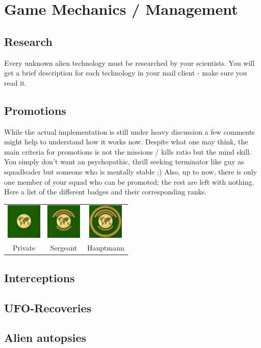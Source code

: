 \section{Game Mechanics / Management}
\subsection{Research}
Every unknown alien technology must be researched by your scientists. You will get a brief description for each technology in your mail client - make sure you read it.

\subsection{Promotions}
While the actual implementation is still under heavy discussion a few comments might help to understand how it works now. Despite what one may think, the main criteria for promotions is not the missions / kills ratio but the mind skill. You simply don't want an psychopathic, thrill seeking terminator like guy as squadleader but someone who is mentally stable ;) Also, up to now, there is only one member of your squad who can be promoted; the rest are left with nothing.
Here a list of the different badges and their corresponding ranks.

\begin{tabular}{ccc}
\includegraphics[scale=1]{images/badges_rekrut_final.jpg} & \includegraphics[scale=1]{images/badges_sergeant_final.jpg} & \includegraphics[scale=1]{images/badges_hauptmann_final.jpg}\\
Private & Sergeant & Hauptmann\\
\end{tabular} 

\subsection{Interceptions}

\subsection{UFO-Recoveries}

\subsection{Alien autopsies}



